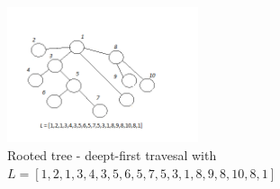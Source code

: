 \documentclass[12pt]{article} %
\begin{document}
\begin{figure}[H]
    \centering
    \includegraphics[width=0.5\textwidth]{travesal}
    \captionsetup{width=0.8\textwidth}
    \caption{Rooted tree - deept-first travesal with $L = [1,2,1,3,4,3,5,6,5,7,5,3,1,8,9,8,10,8,1]$}
    \label{fig:travesal}
\end{figure}
\end{document}
